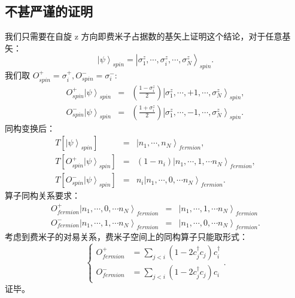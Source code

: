 \documentclass[10pt,UTF8]{ctexart}
\begin{document}
\subsection*{不甚严谨的证明}
\noindent 我们只需要在自旋 z 方向即费米子占据数的基矢上证明这个结论，对于任意基矢：
\begin{equation}
	\left|\psi\right\rangle _{spin}=\left|\sigma_{1}^{z},\cdots,\sigma_{i}^{z},\cdots,\sigma_{N}^{z}\right\rangle _{spin}.
\end{equation}
我们取  $O_{spin}^{+}=\sigma_{i}^{+},O_{spin}^{-}=\sigma_{i}^{-}$: 
\begin{eqnarray}
	O_{spin}^{+}\left|\psi\right\rangle _{spin}
	&=&\left(\frac{1-\sigma_{i}^{z}}{2}\right)\left|\sigma_{1}^{z},\cdots,+1,\cdots,\sigma_{N}^{z}\right\rangle _{spin}, \\
	O_{spin}^{-}\left|\psi\right\rangle _{spin}
	&=&\left(\frac{1+\sigma_{i}^{z}}{2}\right)\left|\sigma_{1}^{z},\cdots,-1,\cdots,\sigma_{N}^{z}\right\rangle _{spin}.
\end{eqnarray}
同构变换后：
\begin{eqnarray}
	T\left[\left|\psi\right\rangle _{spin}\right]&=&\left|n_{1},\cdots,n_{N}\right\rangle _{fermion}, \\
	T\left[O_{spin}^{+}\left|\psi\right\rangle _{spin}\right]&=&\left(1-n_{i}\right)\left|n_{1},\cdots,1,\cdots n_{N}\right\rangle _{fermion}, \\
	T\left[O_{spin}^{-}\left|\psi\right\rangle _{spin}\right]&=&n_{i}\left|n_{1},\cdots,0,\cdots n_{N}\right\rangle _{fermion}.
\end{eqnarray}
算子同构关系要求：
\begin{eqnarray}
	O_{fermion}^{+}\left|n_{1},\cdots,0,\cdots n_{N}\right\rangle _{fermion}&=&\left|n_{1},\cdots,1,\cdots n_{N}\right\rangle _{fermion} \\
	O_{fermion}^{-}\left|n_{1},\cdots,1,\cdots n_{N}\right\rangle _{fermion}&=&\left|n_{1},\cdots,0,\cdots n_{N}\right\rangle _{fermion}.
\end{eqnarray}
考虑到费米子的对易关系，费米子空间上的同构算子只能取形式：
\begin{equation}
	\begin{cases} O_{fermion}^{+} & =\sum_{j<i}\left(1-2c_{j}^{\dagger}c_{j}\right)c_{i}^{\dagger}\\ O_{fermion}^{-} & =\sum_{j<i}\left(1-2c_{j}^{\dagger}c_{j}\right)c_{i} \end{cases}.
\end{equation}
证毕。
\end{document}
